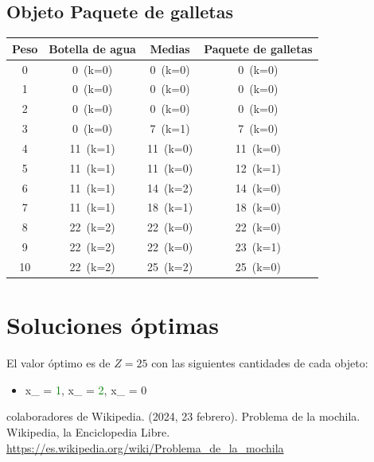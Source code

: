 \documentclass[12pt]{article}
\begin{document}
\begin{landscape}
\subsection*{Objeto Paquete de galletas}
\begin{longtable}{cccc}
\toprule
Peso & Botella de agua & Medias & Paquete de galletas \\
\midrule
0 & \cellcolor{red!20}0~(k=0) & \cellcolor{red!20}0~(k=0) & \cellcolor{red!20}0~(k=0) \\
1 & \cellcolor{red!20}0~(k=0) & \cellcolor{red!20}0~(k=0) & \cellcolor{red!20}0~(k=0) \\
2 & \cellcolor{red!20}0~(k=0) & \cellcolor{red!20}0~(k=0) & \cellcolor{red!20}0~(k=0) \\
3 & \cellcolor{red!20}0~(k=0) & \cellcolor{green!40}7~(k=1) & \cellcolor{red!20}7~(k=0) \\
4 & \cellcolor{green!40}11~(k=1) & \cellcolor{red!20}11~(k=0) & \cellcolor{red!20}11~(k=0) \\
5 & \cellcolor{green!40}11~(k=1) & \cellcolor{red!20}11~(k=0) & \cellcolor{green!40}12~(k=1) \\
6 & \cellcolor{green!40}11~(k=1) & \cellcolor{green!40}14~(k=2) & \cellcolor{red!20}14~(k=0) \\
7 & \cellcolor{green!40}11~(k=1) & \cellcolor{green!40}18~(k=1) & \cellcolor{red!20}18~(k=0) \\
8 & \cellcolor{green!40}22~(k=2) & \cellcolor{red!20}22~(k=0) & \cellcolor{red!20}22~(k=0) \\
9 & \cellcolor{green!40}22~(k=2) & \cellcolor{red!20}22~(k=0) & \cellcolor{green!40}23~(k=1) \\
10 & \cellcolor{green!40}22~(k=2) & \cellcolor{green!40}25~(k=2) & \cellcolor{red!20}25~(k=0) \\
\bottomrule
\end{longtable}
\end{landscape}
\section*{Soluciones óptimas}
El valor óptimo es de $Z = 25$ con las siguientes cantidades de cada objeto:\\
\begin{itemize}
\item x_{} = \textcolor{green}{1}, x_{} = \textcolor{green}{2}, x_{} = 0\\
\end{itemize}
\renewcommand{\refname}{Referencias}
\begin{thebibliography}{9}
 colaboradores de Wikipedia. (2024, 23 febrero). Problema de la mochila. Wikipedia, la Enciclopedia Libre. \\ \url{https://es.wikipedia.org/wiki/Problema_de_la_mochila}
\end{thebibliography}
\end{document}

